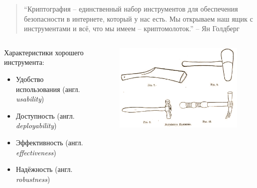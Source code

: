 \documentclass[presentation]{beamer}
\begin{document}
\begin{frame}{}
  \begin{quote}
    ``Криптография -- единственный набор инструментов для обеспечения
    безопасности в интернете, который у нас есть.  Мы открываем наш
    ящик с инструментами и всё, что мы имеем -- криптомолоток.'' -- Ян Голдберг
\end{quote}

  \bigskip

  \begin{columns}
    \begin{column}{0.6\textwidth}

Характеристики хорошего инструмента:
\begin{itemize}
\item Удобство использования (англ. \textit{usability})
\item Доступность (англ. \textit{deployability})
\item Эффективность (англ. \textit{effectiveness})
\item Надёжность (англ. \textit{robustness})
\end{itemize}
    \end{column}
    \begin{column}{0.4\textwidth}
      \begin{figure}[htb]
        \centering
        \includegraphics[width=1.0\textwidth]{popularsciencemo09newy_0033}
      \end{figure}
      \end{column}
  \end{columns}
\end{frame}
\end{document}
